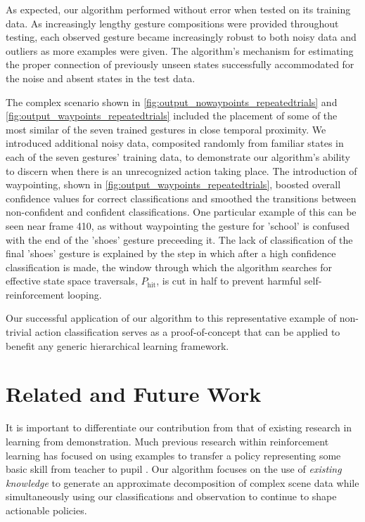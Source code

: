 \documentclass[letterpaper]{article}
\begin{document}
As expected, our algorithm performed without error when tested on its training data. As increasingly lengthy gesture compositions were provided throughout testing, each observed gesture became increasingly robust to both noisy data and outliers as more examples were given. The algorithm's mechanism for estimating the proper connection of previously unseen states successfully accommodated for the noise and absent states in the test data. 

The complex scenario shown in \ref{fig:output_nowaypoints_repeatedtrials} and \ref{fig:output_waypoints_repeatedtrials} included the placement of some of the most similar of the seven trained gestures in close temporal proximity. We introduced additional noisy data, composited randomly from familiar states in each of the seven gestures' training data, to demonstrate our algorithm's ability to discern when there is an unrecognized action taking place. The introduction of waypointing, shown in \ref{fig:output_waypoints_repeatedtrials}, boosted overall confidence values for correct classifications and smoothed the transitions between non-confident and confident classifications. One particular example of this can be seen near frame 410, as without waypointing the gesture for 'school' is confused with the end of the 'shoes' gesture preceeding it. The lack of classification of the final 'shoes' gesture is explained by the step in which after a high confidence classification is made, the window through which the algorithm searches for effective state space traversals, $P_{\mathrm{hit}}$, is cut in half to prevent harmful self-reinforcement looping.

Our successful application of our algorithm to this representative example of non-trivial action classification serves as a proof-of-concept that can be applied to benefit any generic hierarchical learning framework.

\section{Related and Future Work}
\label{sec:future}
It is important to differentiate our contribution from that of
existing research in learning from demonstration.  Much previous research
within reinforcement learning has focused on using examples to
transfer a policy representing some basic skill from teacher to
pupil \cite{JenkinsLFD,LFDSurvey}.  Our algorithm focuses on the use of
\textit{existing knowledge} to generate an approximate decomposition of
complex scene data while simultaneously using our classifications and 
observation to continue to shape actionable policies.
\end{document}
